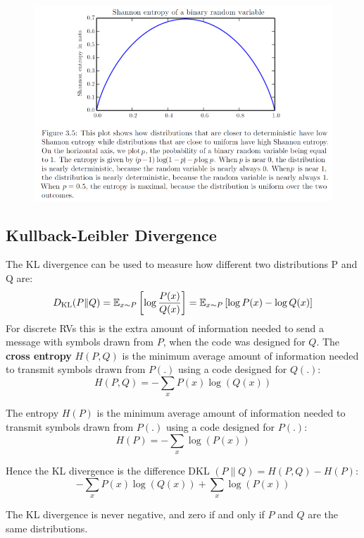 \begin{multicols}{2}
	\begin{figure}[H]
		\centering
		\includegraphics[width=1\linewidth]{images/shannon.png}
	\end{figure}

	\subsection{Kullback-Leibler Divergence}
	The KL divergence can be used to measure how different two distributions P and Q are:
	\[ D_{\text{KL}}(P\lVert Q) = \mathbb{E}_{x\sim P}\left[\log \frac{P(x)}{Q(x)}\right]=
	\mathbb{E}_{x\sim P}\left[\log {P(x)} - \log {Q(x)}\right]
	 \]
	For discrete RVs this is the extra amount of information needed to send a message with symbols drawn from $P$, when the code was designed for $Q$.
	The \textbf{cross entropy} $H(P,Q)$ is the minimum average amount of information needed to transmit symbols drawn from $P(.)$ using a code designed for $Q(.)$:
	\[ H(P,Q) = -\sum_{x} P(x)\log \left(Q(x)\right) \]

	The entropy $H(P)$ is the minimum average amount of information needed to transmit symbols drawn from $P(.)$ using a code designed for $P(.)$:
	\[ H(P) = -\sum_{x} \log\left(P(x)\right) \]

	Hence the KL divergence is the difference DKL $(P\lVert Q)=H(P,Q)-H(P)$:
	\[ -\sum_{x} P(x)\log \left(Q(x)\right) +\sum_{x} \log\left(P(x)\right) \]

	The KL divergence is never negative, and zero if and only if $P$ and $Q$ are the same distributions.

\end{multicols}
\newpage
